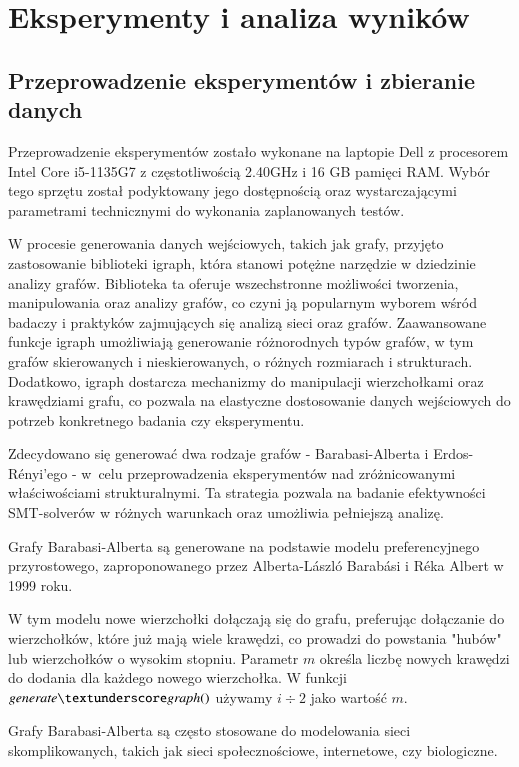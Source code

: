 \chapter{Eksperymenty i analiza wyników}
\section{Przeprowadzenie eksperymentów i zbieranie danych}

Przeprowadzenie eksperymentów zostało wykonane na laptopie Dell z procesorem Intel Core i5-1135G7 z częstotliwością 2.40GHz i 16 GB pamięci RAM. Wybór tego sprzętu został podyktowany jego dostępnością oraz wystarczającymi parametrami technicznymi do wykonania zaplanowanych testów.

W procesie generowania danych wejściowych, takich jak grafy, przyjęto zastosowanie biblioteki igraph, która stanowi potężne narzędzie w dziedzinie analizy grafów. Biblioteka ta oferuje wszechstronne możliwości tworzenia, manipulowania oraz analizy grafów, co czyni ją popularnym wyborem wśród badaczy i praktyków zajmujących się analizą sieci oraz grafów. Zaawansowane funkcje igraph umożliwiają generowanie różnorodnych typów grafów, w tym grafów skierowanych i nieskierowanych, o różnych rozmiarach i strukturach. Dodatkowo, igraph dostarcza mechanizmy do manipulacji wierzchołkami oraz krawędziami grafu, co pozwala na elastyczne dostosowanie danych wejściowych do potrzeb konkretnego badania czy eksperymentu. 

Zdecydowano się generować dwa rodzaje grafów - Barabasi-Alberta i Erdos-Rényi'ego - w~celu przeprowadzenia eksperymentów nad zróżnicowanymi właściwościami strukturalnymi. Ta strategia pozwala na badanie efektywności SMT-solverów w różnych warunkach oraz umożliwia pełniejszą analizę. 

Grafy Barabasi-Alberta są generowane na podstawie modelu preferencyjnego przyrostowego, zaproponowanego przez Alberta-László Barabási i Réka Albert w 1999 roku.

W tym modelu nowe wierzchołki dołączają się do grafu, preferując dołączanie do wierzchołków, które już mają wiele krawędzi, co prowadzi do powstania "hubów" lub wierzchołków o wysokim stopniu.
Parametr $m$ określa liczbę nowych krawędzi do dodania dla każdego nowego wierzchołka. W funkcji $\generategraph$ używamy $i \div 2$ jako wartość $m$.

Grafy Barabasi-Alberta są często stosowane do modelowania sieci skomplikowanych, takich jak sieci społecznościowe, internetowe, czy biologiczne.


